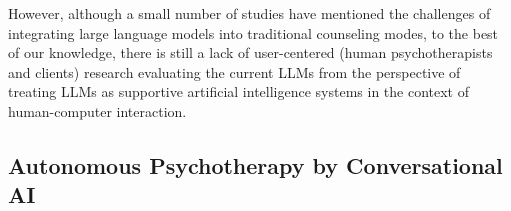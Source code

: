 
However, although a small number of studies \citep{grodniewicz2023waiting, haber2024artificial} have mentioned the challenges of integrating large language models into traditional counseling modes, to the best of our knowledge, there is still a lack of user-centered (human psychotherapists and clients) research evaluating the current LLMs from the perspective of treating LLMs as supportive artificial intelligence systems in the context of human-computer interaction.

\subsection{Autonomous Psychotherapy by Conversational AI}


